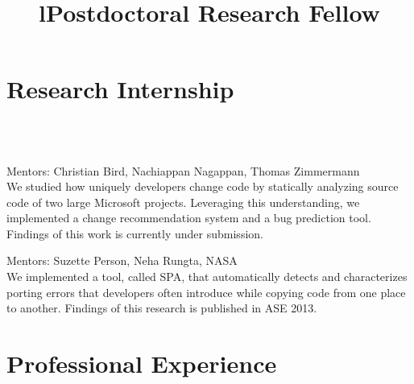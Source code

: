 \documentclass[overlapped,line,letterpaper, 12pt]{res}
\begin{document}
\begin{resume}
\section{\bf Research Internship}
\begin{format}
 \\
\body\\
\end{format}
\vspace{0.5cm}

\begin{position}
Mentors: Christian Bird, Nachiappan Nagappan, Thomas Zimmermann \\
We studied how uniquely developers change code by statically analyzing source code of two large Microsoft projects.
Leveraging this understanding, we implemented a change recommendation system and a bug prediction tool.
Findings of this work is currently under submission.
\end{position}


\begin{position}
Mentors: Suzette Person, Neha Rungta, NASA \\
We implemented a tool, called SPA, that automatically detects and characterizes porting errors that developers often 
introduce while copying code from one place to another. Findings of this research is published in ASE 2013.
\end{position} 



\section{\bf Professional Experience}


\begin{format}
\\
\title{l} \\
\body\\
\end{format}
\vspace{0.5cm}
\title{{Postdoctoral Research Fellow}}
\begin{position}
\end{position} 


\end{resume}
\end{document}
